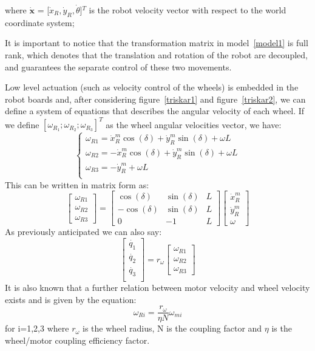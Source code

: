 where $\mathbf{\dot{x}}$ = [$\dot{x}_R,\dot{y}_R,\dot{\theta}$]$^T$ is the robot velocity vector with respect to the world coordinate system;

It is important to notice that the transformation matrix in model~\ref{model1} is full rank, which denotes that the translation and rotation of the robot are decoupled, and guarantees the separate control of these two movements.

Low level actuation (such as velocity control of the wheels) is embedded in the robot boards and, after considering figure~\ref{triskar1} and figure~\ref{triskar2}, we can define a system of equations that describes the angular velocity of each wheel. If we define $[\omega_{R_1}; \omega_{R_2}; \omega_{R_3}]^T$ as the wheel angular velocities vector, we have:
\begin{equation}
\begin{cases} 

\omega_{R1} = \dot{x}^m_R\cos(\delta)+\dot{y}^m_R\sin(\delta)+ \omega L\\ 
\omega_{R2} = -\dot{x}^m_R\cos(\delta)+\dot{y}^m_R\sin(\delta)+\omega L\\ 
\omega_{R3} = -\dot{y}^m_R +  \omega L \\ 
\end{cases} 
\end{equation}
This can be written in matrix form as:
\begin{equation}
\begin{bmatrix}
\omega_{R1}\\
\omega_{R2}\\
\omega_{R3}
\end{bmatrix} = 
\begin{bmatrix}
\cos(\delta) & \sin(\delta) & L \\
-\cos(\delta) & \sin(\delta) & L \\
0 & -1 & L
\end{bmatrix}
\begin{bmatrix}
\dot{x}^m_R\\
\dot{y}^m_R\\
\omega
\end{bmatrix}
\end{equation} 
As previously anticipated we can also say:
\begin{equation}
\begin{bmatrix}
\dot{q_1}\\
\dot{q_2}\\
\dot{q_3}\\
\end{bmatrix} = 
r_\omega
\begin{bmatrix}
\omega_{R1}\\
\omega_{R2}\\
\omega_{R3}
\end{bmatrix}
\end{equation}
It is also known that a further relation between motor velocity and wheel velocity exists and is given by the equation:
\begin{equation}
\omega_{Ri}=\frac{r_\omega}{\eta N}\omega_{mi}
\end{equation}
for i=1,2,3 where $r_\omega$ is the wheel radius, N is the coupling factor and $\eta$ is the wheel/motor coupling efficiency factor.

